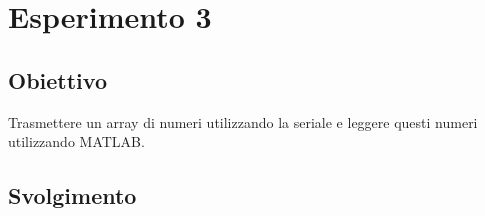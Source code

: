 \chapter*{Esperimento 3}

\section*{Obiettivo}
Trasmettere un array di numeri utilizzando la seriale e leggere questi numeri utilizzando MATLAB.

\section*{Svolgimento}